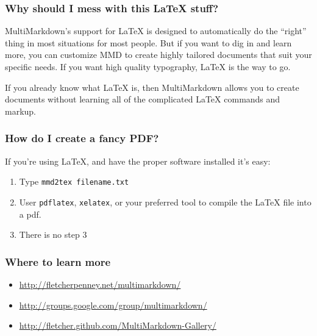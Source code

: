 \begin{frame}

\frametitle{Why should I mess with this LaTeX stuff?}
\label{whyshouldimesswiththislatexstuff}

MultiMarkdown's support for LaTeX is designed to automatically do the ``right''
thing in most situations for most people. But if you want to dig in and learn
more, you can customize MMD to create highly tailored documents that suit your
specific needs. If you want high quality typography, LaTeX is the way to go.

If you already know what LaTeX is, then MultiMarkdown allows you to create
documents without learning all of the complicated LaTeX commands and markup.

\end{frame}

\begin{frame}

\frametitle{How do I create a fancy PDF?}
\label{howdoicreateafancypdf}

If you're using LaTeX, and have the proper software installed it's easy:

\begin{enumerate}
\item Type \texttt{mmd2tex filename.txt}

\item User \texttt{pdflatex}, \texttt{xelatex}, or your preferred tool to compile the LaTeX
 file into a pdf.

\item There is no step 3

\end{enumerate}

\end{frame}

\begin{frame}

\frametitle{Where to learn more}
\label{wheretolearnmore}

\begin{itemize}
\item \href{http://fletcherpenney.net/multimarkdown/}{http:/\slash fletcherpenney.net\slash multimarkdown\slash }

\item \href{http://groups.google.com/group/multimarkdown/}{http:/\slash groups.google.com\slash group\slash multimarkdown\slash }

\item \href{http://fletcher.github.com/MultiMarkdown-Gallery/}{http:/\slash fletcher.github.com\slash MultiMarkdown-Gallery\slash }

\end{itemize}

\end{frame}

